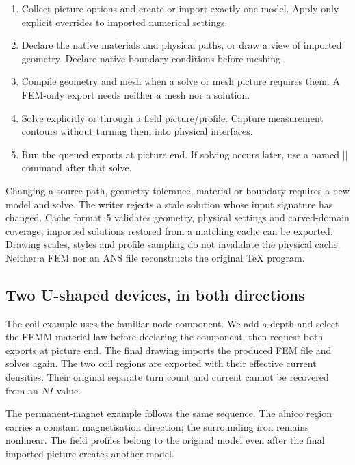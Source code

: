 \begin{enumerate}
\item Collect picture options and create or import exactly one model. Apply only
      explicit overrides to imported numerical settings.
\item Declare the native materials and physical paths, or draw a view of imported
      geometry. Declare native boundary conditions before meshing.
\item Compile geometry and mesh when a solve or mesh picture requires them.
      A FEM-only export needs neither a mesh nor a solution.
\item Solve explicitly or through a field picture/profile. Capture measurement
      contours without turning them into physical interfaces.
\item Run the queued exports at picture end. If solving occurs later, use a
      named |\femmexport| command after that solve.
\end{enumerate}

Changing a source path, geometry tolerance, material or boundary requires a new
model and solve. The writer rejects a stale solution whose input signature has
changed. Cache format~5 validates geometry, physical settings and carved-domain
coverage; imported solutions restored from a matching cache can be exported.
Drawing scales, styles and profile sampling do not invalidate the physical cache.
Neither a FEM nor an ANS file reconstructs the original TeX program.

\subsection{Two U-shaped devices, in both directions}

The coil example uses the familiar node component. We add a depth and select the
FEMM material law before declaring the component, then request both exports at
picture end. The final drawing imports the produced FEM file and solves again.
The two coil regions are exported with their effective current densities. Their
original separate turn count and current cannot be recovered from an $NI$ value.

The permanent-magnet example follows the same sequence. The alnico region carries
a constant magnetisation direction; the surrounding iron remains nonlinear.
The field profiles belong to the original model even after the final imported
picture creates another model.

